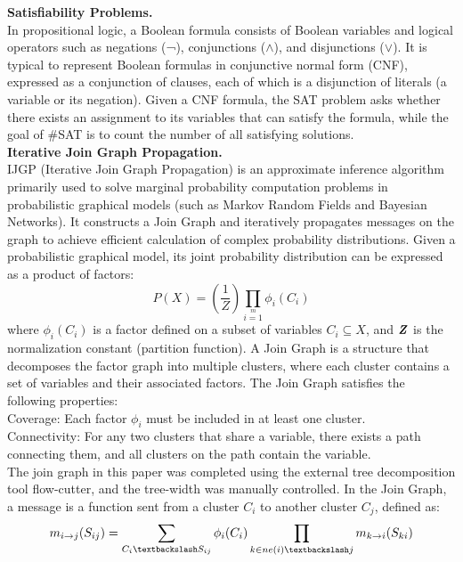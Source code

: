 \textbf{Satisfiability Problems.\\} 
In propositional logic, a Boolean formula consists of Boolean variables and logical operators such as negations (¬), conjunctions ($ \land $), and disjunctions ($\lor$). It is typical to represent Boolean formulas in conjunctive normal form (CNF), expressed as a conjunction of clauses, each of which is a disjunction of literals (a variable or its negation). Given a CNF formula, the SAT problem asks whether there exists an assignment to its variables that can satisfy the formula, while the goal of \#SAT is to count the number of all satisfying solutions.\\
\textbf{Iterative Join Graph Propagation.\\}
IJGP (Iterative Join Graph Propagation) is an approximate inference algorithm primarily used to solve marginal probability computation problems in probabilistic graphical models (such as Markov Random Fields and Bayesian Networks). It constructs a Join Graph and iteratively propagates messages on the graph to achieve efficient calculation of complex probability distributions.
Given a probabilistic graphical model, its joint probability distribution can be expressed as a product of factors:
\begin{equation}
P(X)=\left(\frac{1}{Z}\right)\prod\limits_{i=1}\limits^m\phi_i(C_i)
\end{equation}
where \(\phi_i(C_i)\) is a factor defined on a subset of variables \(C_i\subseteq X\), and
\(\textbf{\textit{Z}}\) is the normalization constant (partition function).
A Join Graph is a structure that decomposes the factor graph into multiple clusters, where each cluster contains a set of variables and their associated factors. The Join Graph satisfies the following properties:\\
Coverage: Each factor \(\phi_i\) must be included in at least one cluster.\\
Connectivity: For any two clusters that share a variable, there exists a path connecting them, and all clusters on the path contain the variable.\\
The join graph in this paper was completed using the external tree decomposition tool flow-cutter, and the tree-width was manually controlled.
In the Join Graph, a message is a function sent from a cluster \(C_i\) to another cluster \(C_j\), defined as:
\begin{equation}
m_{i\rightarrow j}(S_{ij})=\sum\limits_{C_i\textbackslash S_{ij}}\phi_i(C_i)\prod\limits_{k\in ne(i)\textbackslash j}m_{k\rightarrow i}(S_{ki})
\end{equation}
